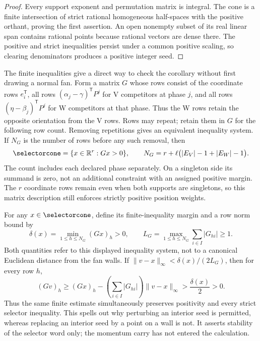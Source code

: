 \documentclass[11pt,letterpaper]{article}
\theoremstyle{definition}
\theoremstyle{remark}
\numberwithin{equation}{section}
\begin{document}
\begin{proof}
Every support exponent and permutation matrix is integral.  The cone is a
finite intersection of strict rational homogeneous half-spaces with the
positive orthant, proving the first assertion.  An open nonempty subset of
its real linear span contains rational points because rational vectors are
dense there.  The positive and strict inequalities persist under a common
positive scaling, so clearing denominators produces a positive integer
seed.
\end{proof}

The finite inequalities give a direct way to check the corollary without
first drawing a normal fan.  Form a matrix \(G\) whose rows consist of the
coordinate rows \(e_i^{\mathsf T}\), all rows
\((\alpha_j-\gamma)^{\mathsf T}P^j\) for V competitors at phase \(j\),
and all rows \((\eta-\beta_j)^{\mathsf T}P^j\) for W competitors at that
phase.  Thus the W rows retain the opposite orientation from the V rows.
Rows may repeat; retain them in \(G\) for the following row count.
Removing repetitions gives an equivalent inequality system.
If \(N_G\) is the number of rows before any such removal, then
\begin{equation}
 \selectorcone=\{x\in\mathbb R^r:Gx>0\},
 \qquad
 N_G=r+\ell\bigl(|E_V|-1+|E_W|-1\bigr).
 \label{eq:finite-cone-rows}
\end{equation}
The count includes each declared phase separately.  On a singleton side its
summand is zero, not an additional constraint with an assigned positive
margin.  The \(r\) coordinate rows remain even when both supports are
singletons, so this matrix description still enforces strictly positive
position weights.

For any \(x\in\selectorcone\), define its finite-inequality margin and a row
norm bound by
\begin{equation}
 \delta(x)=\min_{1\leq h\leq N_G}(Gx)_h>0,
 \qquad
 L_G=\max_{1\leq h\leq N_G}\sum_{i\in I}|G_{hi}|\geq1.
 \label{eq:finite-cone-margin}
\end{equation}
Both quantities refer to this displayed inequality system, not to a
canonical Euclidean distance from the fan walls.  If
\(\|v-x\|_\infty<\delta(x)/(2L_G)\), then for every row \(h\),
\begin{equation}
 (Gv)_h\geq(Gx)_h-
   \left(\sum_{i\in I}|G_{hi}|\right)\|v-x\|_\infty
   >\frac{\delta(x)}2>0.
 \label{eq:finite-cone-stability}
\end{equation}
Thus the same finite estimate simultaneously preserves positivity and
every strict selector inequality.  This spells out why perturbing an
interior seed is permitted, whereas replacing an interior seed by a point
on a wall is not.  It asserts stability of the selector word only; the
momentum carry has not entered the calculation.
\end{document}
